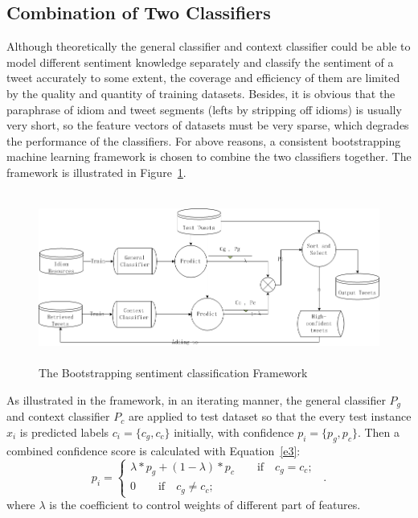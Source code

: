 \documentclass{llncs}
\begin{document}
\subsection{Combination of Two Classifiers}
\label{combination}
Although theoretically the general classifier and context classifier could be able to model different sentiment knowledge separately and classify the sentiment of a tweet accurately to some extent, the coverage and efficiency of them are limited by the quality and quantity of training datasets. 
Besides, it is obvious that the paraphrase of idiom and tweet segments (lefts by stripping off idioms) is usually very short, so the feature vectors of datasets must be very sparse, which degrades the performance of the classifiers. 
For above reasons, a consistent bootstrapping machine learning framework is chosen to combine the two classifiers together. 
The framework is illustrated in Figure~\ref{fig1}. 
\begin{figure} 
\centering%
\includegraphics[width=5.0in,height=2.2in]{itse13.jpg}
\caption{The Bootstrapping sentiment classification Framework}
\label{fig1}
\end{figure}
As illustrated in the framework, in an iterating manner, the general classifier $ P_{g} $ and context classifier $ P_{c} $ are applied to test dataset so that the every test instance $ x_{i} $ is predicted labels $ c_{i}=\lbrace c_{g},c_{c}\rbrace $ initially, with confidence $ p_{i}= \lbrace p_{g},p_{c}\rbrace$. 
Then a combined confidence score is calculated with Equation~\ref{e3}:
\begin{equation}
\label{e3}
p_{i}=\left\{
\begin{array}{rcl}
\lambda\ast p_{g} + \left( 1-\lambda \right) \ast p_{c} \qquad \mbox{if} \quad c_{g}=c_{c};\\
0 \qquad \mbox{if} \quad c_{g} \neq c_{c};
\end{array}
\right. \enspace .
\end{equation}
where $ \lambda $ is the coefficient to control weights of different part of features. 
\end{document}
